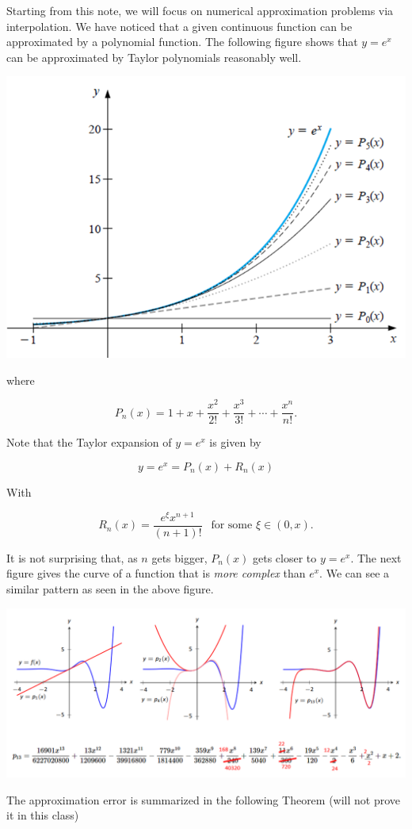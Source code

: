 \documentclass[
]{book}
\begin{document}
Starting from this note, we will focus on numerical approximation problems via interpolation. We have noticed that a given continuous function can be approximated by a polynomial function. The following figure shows that \(y = e^x\) can be approximated by Taylor polynomials reasonably well.

\begin{center}\includegraphics[width=0.5\linewidth]{img05/w05-TaylorApprox2NaturalBaseExp} \end{center}

where

\[
P_n(x) = 1 + x + \frac{x^2}{2!} + \frac{x^3}{3!} + \cdots + \frac{x^n}{n!}.
\]

Note that the Taylor expansion of \(y = e^x\) is given by

\[
y = e^x = P_n(x) + R_n(x)
\]

With

\[
R_n(x) = \frac{e^{\xi}x^{n+1}}{(n+1)!} \ \ \text{ for some } \xi \in (0, x).
\]

It is not surprising that, as \(n\) gets bigger, \(P_n(x)\) gets closer to \(y = e^x\). The next figure gives the curve of a function that is \emph{more complex} than \(e^x\). We can see a similar pattern as seen in the above figure.

\begin{center}\includegraphics[width=0.9\linewidth]{img05/w05-TaylorApprox2GenFun} \end{center}

The approximation error is summarized in the following Theorem (will not prove it in this class)
\end{document}
